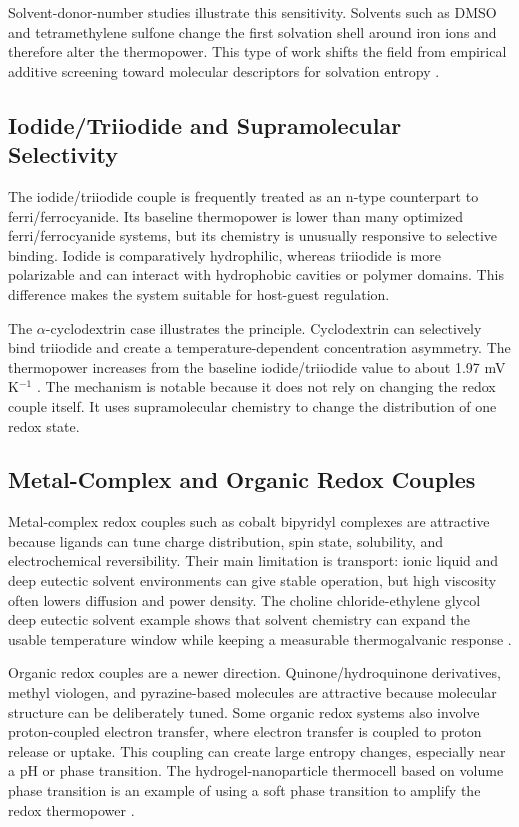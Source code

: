 Solvent-donor-number studies illustrate this sensitivity. Solvents such as
DMSO and tetramethylene sulfone change the first solvation shell around iron
ions and therefore alter the thermopower. This type of work shifts the field
from empirical additive screening toward molecular descriptors for solvation
entropy \citep{chen2023solvation}.

\subsection{Iodide/Triiodide and Supramolecular Selectivity}

The iodide/triiodide couple is frequently treated as an n-type counterpart to
ferri/ferrocyanide. Its baseline thermopower is lower than many optimized
ferri/ferrocyanide systems, but its chemistry is unusually responsive to
selective binding. Iodide is comparatively hydrophilic, whereas triiodide is
more polarizable and can interact with hydrophobic cavities or polymer domains.
This difference makes the system suitable for host-guest regulation.

The $\alpha$-cyclodextrin case illustrates the principle. Cyclodextrin can
selectively bind triiodide and create a temperature-dependent concentration
asymmetry. The thermopower increases from the baseline iodide/triiodide value
to about 1.97 mV K$^{-1}$ \citep{zhou2016supramolecular}. The mechanism is
notable because it does not rely on changing the redox couple itself. It
uses supramolecular chemistry to change the distribution of one redox state.

\subsection{Metal-Complex and Organic Redox Couples}

Metal-complex redox couples such as cobalt bipyridyl complexes are attractive
because ligands can tune charge distribution, spin state, solubility, and
electrochemical reversibility. Their main limitation is transport: ionic
liquid and deep eutectic solvent environments can give stable operation, but
high viscosity often lowers diffusion and power density. The choline
chloride-ethylene glycol deep eutectic solvent example shows that solvent
chemistry can expand the usable temperature window while keeping a measurable
thermogalvanic response \citep{antariksa2021deep}.

Organic redox couples are a newer direction. Quinone/hydroquinone derivatives,
methyl viologen, and pyrazine-based molecules are attractive because molecular
structure can be deliberately tuned. Some organic redox systems also involve
proton-coupled electron transfer, where electron transfer is coupled to proton
release or uptake. This coupling can create large entropy changes, especially
near a pH or phase transition. The hydrogel-nanoparticle thermocell based on
volume phase transition is an example of using a soft phase transition to
amplify the redox thermopower \citep{guo2020nanoparticle}.

